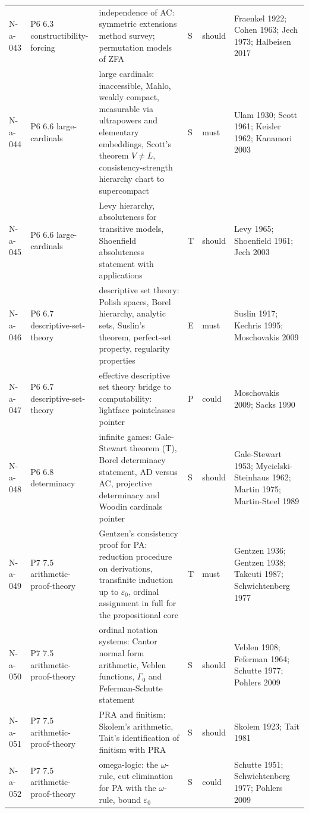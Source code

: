 \begin{longtable}{@{}p{0.52in}p{0.85in}p{2.5in}p{0.22in}p{0.42in}p{1.95in}@{}}
N-a-043 & P6 6.3 constructibility-forcing & independence of AC: symmetric extensions method survey; permutation models of ZFA & S & should & Fraenkel 1922; Cohen 1963; Jech 1973; Halbeisen 2017 \\
N-a-044 & P6 6.6 large-cardinals & large cardinals: inaccessible, Mahlo, weakly compact, measurable via ultrapowers and elementary embeddings, Scott's theorem \(V\neq L\), consistency-strength hierarchy chart to supercompact & S & must & Ulam 1930; Scott 1961; Keisler 1962; Kanamori 2003 \\
N-a-045 & P6 6.6 large-cardinals & Levy hierarchy, absoluteness for transitive models, Shoenfield absoluteness statement with applications & T & should & Levy 1965; Shoenfield 1961; Jech 2003 \\
N-a-046 & P6 6.7 descriptive-set-theory & descriptive set theory: Polish spaces, Borel hierarchy, analytic sets, Suslin's theorem, perfect-set property, regularity properties & E & must & Suslin 1917; Kechris 1995; Moschovakis 2009 \\
N-a-047 & P6 6.7 descriptive-set-theory & effective descriptive set theory bridge to computability: lightface pointclasses pointer & P & could & Moschovakis 2009; Sacks 1990 \\
N-a-048 & P6 6.8 determinacy & infinite games: Gale-Stewart theorem (T), Borel determinacy statement, AD versus AC, projective determinacy and Woodin cardinals pointer & S & should & Gale-Stewart 1953; Mycielski-Steinhaus 1962; Martin 1975; Martin-Steel 1989 \\
N-a-049 & P7 7.5 arithmetic-proof-theory & Gentzen's consistency proof for PA: reduction procedure on derivations, transfinite induction up to \(\varepsilon_0\), ordinal assignment in full for the propositional core & T & must & Gentzen 1936; Gentzen 1938; Takeuti 1987; Schwichtenberg 1977 \\
N-a-050 & P7 7.5 arithmetic-proof-theory & ordinal notation systems: Cantor normal form arithmetic, Veblen functions, \(\Gamma_0\) and Feferman-Schutte statement & S & should & Veblen 1908; Feferman 1964; Schutte 1977; Pohlers 2009 \\
N-a-051 & P7 7.5 arithmetic-proof-theory & PRA and finitism: Skolem's arithmetic, Tait's identification of finitism with PRA & S & should & Skolem 1923; Tait 1981 \\
N-a-052 & P7 7.5 arithmetic-proof-theory & omega-logic: the \(\omega\)-rule, cut elimination for PA with the \(\omega\)-rule, bound \(\varepsilon_0\) & S & could & Schutte 1951; Schwichtenberg 1977; Pohlers 2009 \\

\end{longtable}
